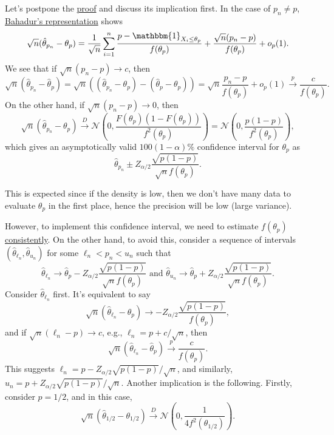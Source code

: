 Let's postpone the \hyperref[pf:Bahadur-representation]{proof} and discuss its implication first. In the case of \(p_n \neq p\), \hyperref[thm:Bahadur-representation]{Bahadur's representation} shows
\[
	\sqrt{n} (\hat{\theta} _{p_n} - \theta _p)
	= \frac{1}{\sqrt{n} } \sum_{i=1}^{n} \frac{p - \mathbbm{1}_{X_i \leq \theta _p} }{f(\theta _p)} + \frac{\sqrt{n} (p_n - p)}{f(\theta _p)} + o_p(1).
\]
We see that if \(\sqrt{n} (p_n - p) \to c\), then
\[
	\sqrt{n} (\hat{\theta} _{p_n} - \hat{\theta} _p)
	= \sqrt{n} \left( (\hat{\theta} _{p_n} - \theta _p) - (\hat{\theta} _p - \theta _p) \right)
	= \sqrt{n} \frac{p_n - p}{f(\theta _p)} + o_p(1)
	\overset{p}{\to} \frac{c}{f(\theta _p)}.
\]
On the other hand, if \(\sqrt{n} (p_n - p) \to 0\), then
\[
	\sqrt{n} (\hat{\theta} _{p_n} - \theta _p)
	\overset{D}{\to} \mathcal{N} \left( 0, \frac{F(\theta _p) (1 - F(\theta _p))}{f^2(\theta _p)} \right)
	= \mathcal{N} \left( 0, \frac{p (1 - p)}{f^2(\theta _p)} \right) ,
\]
which gives an asymptotically valid \(100(1 - \alpha )\%\) confidence interval for \(\theta _p\) as
\[
	\hat{\theta} _{p_n} \pm Z_{\alpha / 2} \frac{\sqrt{p(1 - p)} }{\sqrt{n} f(\theta _p)}.
\]

\begin{intuition}
	This is expected since if the density is low, then we don't have many data to evaluate \(\theta _p\) in the first place, hence the precision will be low (large variance).
\end{intuition}

However, to implement this confidence interval, we need to estimate \(f(\theta _p)\) \hyperref[def:consistent]{consistently}. On the other hand, to avoid this, consider a sequence of intervals \((\hat{\theta} _{\ell _n}, \hat{\theta} _{u_n})\) for some \(\ell _n < p_n < u_n\) such that
\[
	\hat{\theta} _{\ell _n}
	\to \hat{\theta} _p - Z_{\alpha / 2} \frac{\sqrt{p (1 - p)} }{\sqrt{n} f(\theta _p)}
	\text{ and }
	\hat{\theta} _{u_n}
	\to \hat{\theta} _p + Z_{\alpha / 2} \frac{\sqrt{p (1 - p)} }{\sqrt{n} f(\theta _p)}.
\]
Consider \(\hat{\theta} _{\ell _n}\) first. It's equivalent to say
\[
	\sqrt{n} (\hat{\theta} _{\ell _n} - \hat{\theta} _p)
	\to -Z_{\alpha / 2} \frac{\sqrt{p (1 - p)} }{f(\theta _p)},
\]
and if \(\sqrt{n} (\ell _n - p) \to c\), e.g., \(\ell _n = p + c / \sqrt{n} \), then
\[
	\sqrt{n} (\hat{\theta} _{\ell _n} - \hat{\theta} _p) \overset{p}{\to} \frac{c}{f(\theta _p)}.
\]
This suggests \(\ell _n = p - Z_{\alpha / 2} \sqrt{p (1 - p)} / \sqrt{n} \), and similarly, \(u_n = p + Z_{\alpha / 2} \sqrt{p (1 - p)} / \sqrt{n} \). Another implication is the following. Firstly, consider \(p = 1 / 2\), and in this case,
\[
	\sqrt{n} (\hat{\theta} _{1 / 2} - \theta _{1 / 2})
	\overset{D}{\to} \mathcal{N} \left( 0, \frac{1}{4 f^2(\theta _{1 / 2})} \right) .
\]

